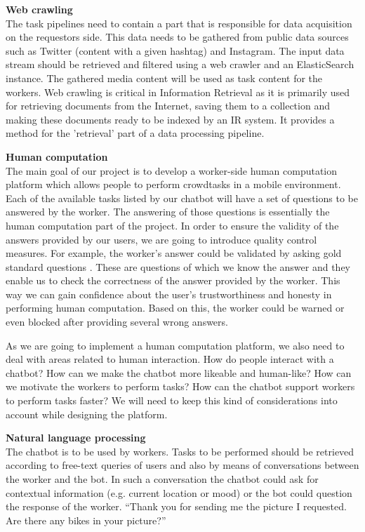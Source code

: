 \documentclass[a4paper,dutch,fleqn]{exam}
\begin{document}
\textbf{Web crawling} \\
The task pipelines need to contain a part that is responsible for data acquisition on the requestors side. This data needs to be gathered from public data sources such as Twitter (content with a given hashtag) and Instagram. The input data stream should be retrieved and filtered using a web crawler and an ElasticSearch instance. The gathered media content will be used as task content for the workers. Web crawling is critical in Information Retrieval as it is primarily used for retrieving documents from the Internet, saving them to a collection and making these documents ready to be indexed by an IR system. It provides a method for the 'retrieval' part of a data processing pipeline.

\textbf{Human computation} \\
The main goal of our project is to develop a worker-side human computation platform which allows people to perform crowdtasks in a mobile environment. Each of the available tasks listed by our chatbot will have a set of questions to be answered by the worker. The answering of those questions is essentially the human computation part of the project. In order to ensure the validity of the answers provided by our users, we are going to introduce quality control measures. For example, the worker's answer could be validated by  asking gold standard questions \cite{oleson2011programmatic}. These are questions of which we know the answer and they enable us to check the correctness of the answer provided by the worker. This way we can gain confidence about the user's trustworthiness and honesty in performing human computation. Based on this, the worker could be warned or even blocked after providing several wrong answers.  

As we are going to implement a human computation platform, we also need to deal with areas related to human interaction. How do people interact with a chatbot? How can we make the chatbot more likeable and human-like? How can we motivate the workers to perform tasks? How can the chatbot support workers to perform tasks faster? We will need to keep this kind of considerations into account while designing the platform.

\textbf{Natural language processing} \\
The chatbot is to be used by workers. Tasks to be performed should be retrieved according to free-text queries of users and also by means of conversations between the worker and the bot. In such a conversation the chatbot could ask for contextual information (e.g. current location or mood) or the bot could question the response of the worker. “Thank you for sending me the picture I requested. Are there any bikes in your picture?”
\end{document}
